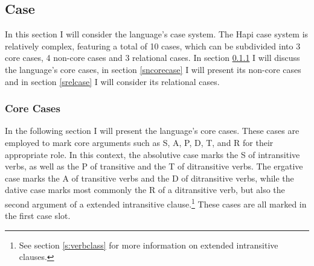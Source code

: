 \documentclass[a4paper, 12pt, oneside]{memoir}
\begin{document}
\subsection{Case}\label{scase}
In this section I will consider the language's case system. The Hapi case system is relatively complex, featuring a total of 10 cases, which can be subdivided into 3 core cases, 4 non-core cases and 3 relational cases. In section \ref{scorecase} I will discuss the language's core cases, in section \ref{sncorecase} I will present its non-core cases and in section \ref{srelcase} I will consider its relational cases.
\subsubsection{Core Cases}\label{scorecase}
In the following section I will present the language's core cases. These cases are employed to mark core arguments such as S, A, P, D, T, and R for their appropriate role. In this context, the absolutive case marks the S of intransitive verbs, as well as the P of transitive and the T of ditransitive verbs. The ergative case marks the A of transitive verbs and the D of ditransitive verbs, while the dative case marks most commonly the R of a ditransitive verb, but also the second argument of a extended intransitive clause.\footnote{See section \ref{s:verbclass} for more information on extended intransitive clauses.} These cases are all marked in the first case slot.
\end{document}
